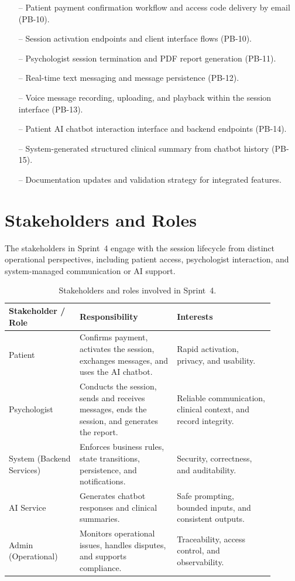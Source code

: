 \documentclass[a4paper,12pt]{report}
\begin{document}
\begin{itemize}[leftmargin=*]
  \item[--] Patient payment confirmation workflow and access code delivery by email (PB-10).
  \item[--] Session activation endpoints and client interface flows (PB-10).
  \item[--] Psychologist session termination and PDF report generation (PB-11).
  \item[--] Real-time text messaging and message persistence (PB-12).
  \item[--] Voice message recording, uploading, and playback within the session interface (PB-13).
  \item[--] Patient AI chatbot interaction interface and backend endpoints (PB-14).
  \item[--] System-generated structured clinical summary from chatbot history (PB-15).
  \item[--] Documentation updates and validation strategy for integrated features.
\end{itemize}

\section{Stakeholders and Roles}
The stakeholders in Sprint~4 engage with the session lifecycle from distinct operational perspectives, including patient access, psychologist interaction, and system-managed communication or AI support.

\begin{table}[H]
\centering
\begin{tabular}{@{} L{0.24\linewidth} L{0.33\linewidth} L{0.33\linewidth} @{}}
\toprule
\textbf{Stakeholder / Role} &
\textbf{Responsibility} &
\textbf{Interests} \\
\midrule
Patient &
Confirms payment, activates the session, exchanges messages, and uses the AI chatbot. &
Rapid activation, privacy, and usability. \\
Psychologist &
Conducts the session, sends and receives messages, ends the session, and generates the report. &
Reliable communication, clinical context, and record integrity. \\
System (Backend Services) &
Enforces business rules, state transitions, persistence, and notifications. &
Security, correctness, and auditability. \\
AI Service &
Generates chatbot responses and clinical summaries. &
Safe prompting, bounded inputs, and consistent outputs. \\
Admin (Operational) &
Monitors operational issues, handles disputes, and supports compliance. &
Traceability, access control, and observability. \\
\bottomrule
\end{tabular}
\caption{Stakeholders and roles involved in Sprint~4.}
\label{tab:sprint4-stakeholders}
\end{table}
\end{document}
